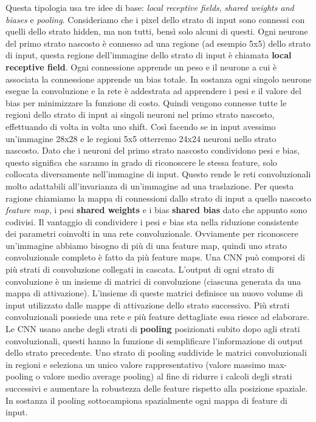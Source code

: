 \documentclass[twoside,twocolumn,10pt]{extarticle}
\theoremstyle{definition}
\begin{document}
Questa tipologia usa tre idee di base: \textit{local receptive fields}, \textit{shared weights and biases} e \textit{pooling}. 
Consideriamo che i pixel dello strato di input sono connessi con quelli dello strato hidden, ma non tutti, bensì solo alcuni di questi. Ogni neurone del primo strato nascosto è connesso ad una regione (ad esempio 5x5) dello strato di input, questa regione dell'immagine dello strato di input è chiamata \textbf{local receptive field}. Ogni connessione apprende un peso e il neurone a cui è associata la connessione apprende un bias totale. In sostanza ogni singolo neurone esegue la convoluzione e la rete è addestrata ad apprendere i pesi e il valore del bias per minimizzare la funzione di costo. Quindi vengono connesse tutte le regioni dello strato di input ai singoli neuroni nel primo strato nascosto, effettuando di volta in volta uno shift. Così facendo se in input avessimo un'immagine 28x28 e le regioni 5x5 otterremo 24x24 neuroni nello strato nascosto.
Dato che i neuroni del primo strato nascosto condividono pesi e bias, questo significa che saranno in grado di riconoscere le stessa feature, solo collocata diversamente nell'immagine di input. Questo rende le reti convoluzionali molto adattabili all'invarianza di un'immagine ad una traslazione. Per questa ragione chiamiamo la mappa di connessioni dallo strato di input a quello nascosto \textit{feature map}, i pesi \textbf{shared weights} e i bias \textbf{shared bias} dato che appunto sono codivisi. Il vantaggio di condividere i pesi e bias sta nella riduzione consistente dei parametri coinvolti in una rete convoluzionale.
Ovviamente per riconoscere un'immagine abbiamo bisogno di più di una feature map, quindi uno strato convoluzionale completo è fatto da più feature maps.
Una CNN può comporsi di più strati di convoluzione collegati in cascata. L’output di ogni strato di convoluzione è un insieme di matrici di convoluzione (ciascuna generata da una mappa di attivazione). L’insieme di queste matrici definisce un nuovo volume di input utilizzato dalle mappe di attivazione dello strato successivo. Più strati convoluzionali possiede una rete e più feature dettagliate essa riesce ad elaborare.
Le CNN usano anche degli strati di \textbf{pooling} posizionati subito dopo agli strati convoluzionali, questi hanno la funzione di semplificare l'informazione di output dello strato precedente. Uno strato di pooling suddivide le matrici convoluzionali in regioni e seleziona un unico valore rappresentativo (valore massimo max-pooling o valore medio average pooling) al fine di ridurre i calcoli degli strati successivi e aumentare la robustezza delle feature rispetto alla posizione spaziale. In sostanza il pooling sottocampiona spazialmente ogni mappa di feature di input.
\end{document}
